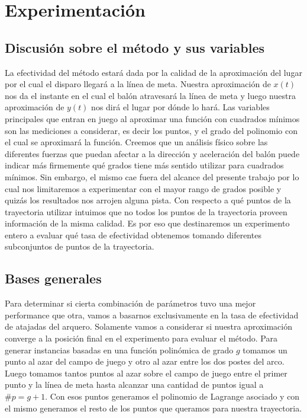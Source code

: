\section{Experimentación}

\subsection{Discusión sobre el método y sus variables}
La efectividad del método estará dada por la calidad de la aproximación del lugar por el cual el disparo llegará a la línea de meta. 
Nuestra aproximación de $x(t)$ nos da el instante en el cual el balón atravesará la línea de meta y luego nuestra aproximación
de $y(t)$ nos dirá el lugar por dónde lo hará. Las variables principales que entran en juego al aproximar una función con 
cuadrados mínimos son las mediciones a considerar, es decir los puntos, y el grado del polinomio con el cual se aproximará la función.
Creemos que un análisis físico sobre las diferentes fuerzas que puedan afectar a la dirección y aceleración del balón puede indicar 
más firmemente qué grados tiene más sentido utilizar para cuadrados mínimos. Sin embargo, el mismo cae fuera del alcance del presente 
trabajo por lo cual nos limitaremos a experimentar con el mayor rango de grados posible y quizás los resultados nos arrojen alguna pista.
Con respecto a qué puntos de la trayectoria utilizar intuimos que no todos los puntos de la trayectoria proveen información de la misma 
calidad. Es por eso que destinaremos un experimento entero a evaluar qué tasa de efectividad obtenemos tomando diferentes subconjuntos 
de puntos de la trayectoria.

\subsection{Bases generales}
Para determinar si cierta combinación de parámetros tuvo una mejor performance que otra, vamos a basarnos exclusivamente en la tasa de
efectividad de atajadas del arquero. Solamente vamos a considerar si nuestra aproximación converge a la posición final en el experimento
para evaluar el método.
Para generar instancias basadas en una función polinómica de grado $g$ tomamos un punto al azar del campo de juego y otro al azar entre los dos postes 
del arco. Luego tomamos tantos puntos al azar sobre el campo de juego entre el primer punto y la línea de meta hasta alcanzar una cantidad
de puntos igual a $\#p = g + 1$. Con esos puntos generamos el polinomio de Lagrange asociado y con el mismo generamos el resto de los puntos
que queramos para nuestra trayectoria.

